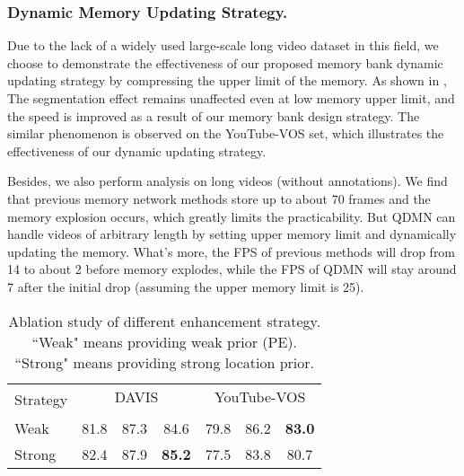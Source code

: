\documentclass[runningheads]{llncs}
\begin{document}
    \subsubsection{Dynamic Memory Updating Strategy.} Due to the lack of a widely used large-scale long video dataset in this field, we choose to demonstrate the effectiveness of our proposed memory bank dynamic updating strategy by compressing the upper limit of the memory.
    As shown in , The segmentation effect remains unaffected even at low memory upper limit, and the speed is improved
    as a result of our memory bank design strategy.
    The similar phenomenon is observed on the YouTube-VOS set, which illustrates the effectiveness of our dynamic updating strategy.
    
    Besides, we also perform analysis on long videos (without annotations).
    We find that previous memory network 
    methods store up to about 70 frames and the memory explosion occurs, 
    which greatly limits the practicability. 
    But QDMN can handle videos of arbitrary length by setting upper memory limit and dynamically updating the memory.
What's more, the FPS of previous methods will drop from 14 to about 2 before memory explodes, while the FPS of QDMN will stay around 7 after the initial drop (assuming the upper memory limit is 25).
    
    \begin{wraptable}{r}{6cm}
    \centering
\caption{Ablation study of different enhancement strategy. 
    ``Weak" means providing weak prior (PE). 
    ``Strong" means providing strong location prior.}
    \label{table strategy}
\begin{tabular}{lcccccc}
    \toprule[1.5pt]
            
            \multirow{2}{*}{Strategy} &\multicolumn{3}{c}{DAVIS} &\multicolumn{3}{c}{YouTube-VOS}\\
\cmidrule(lr){2-4} \cmidrule(lr){5-7}
&   &   &   &   &   & \\
              \midrule
    
    Weak              & 81.8    & 87.3 & 84.6 & 79.8 & 86.2 & \textbf{83.0}    \\        \noalign{\smallskip} 
    Strong              & 82.4  & 87.9  &\textbf{85.2}   & 77.5 & 83.8 & 80.7 \\
    \bottomrule[1.5pt]
    \end{tabular}
    \end{wraptable}
    
\end{document}
